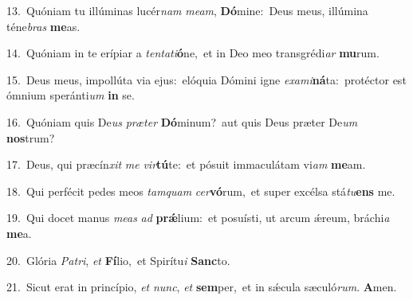 {\numbfont\textcolor{\numbcolor}{13.}}~Quóniam tu illúminas lucér\textit{nam} \textit{me}\-\textit{am}, \textbf{Dó}\-mine:~\star Deus meus, illúmina téne\textit{bras} \textbf{me}\-as.\par
{\numbfont\textcolor{\numbcolor}{14.}}~Quóniam in te erípiar a \textit{ten}\-\textit{ta}\textit{ti}\textbf{ó}ne,~\star et in Deo meo transgrédi\textit{ar} \textbf{mu}\-rum.\par
{\numbfont\textcolor{\numbcolor}{15.}}~Deus meus, impollúta via ejus:~\dagger elóquia Dómini igne \textit{ex}\-\textit{a}\textit{mi}\textbf{ná}ta:~\star protéctor est ómnium speránti\textit{um} \textbf{in} se.\par
{\numbfont\textcolor{\numbcolor}{16.}}~Quóniam quis De\textit{us} \textit{præ}\-\textit{ter} \textbf{Dó}\-minum?~\star aut quis Deus præter De\textit{um} \textbf{nos}\-trum?\par
{\numbfont\textcolor{\numbcolor}{17.}}~Deus, qui præcín\textit{xit} \textit{me} \textit{vir}\-\textbf{tú}te:~\star et pósuit immaculátam vi\textit{am} \textbf{me}\-am.\par
{\numbfont\textcolor{\numbcolor}{18.}}~Qui perfécit pedes meos \textit{tam}\-\textit{quam} \textit{cer}\-\textbf{vó}rum,~\star et super excélsa stá\-\textit{tu}\-\textbf{ens} me.\par
{\numbfont\textcolor{\numbcolor}{19.}}~Qui docet manus \textit{me}\-\textit{as} \textit{ad} \textbf{prǽ}\-lium:~\star et posuísti, ut arcum ǽreum, bráchi\textit{a} \textbf{me}\-a.\par
{\numbfont\textcolor{\numbcolor}{20.}}~Glória \textit{Pa}\-\textit{tri}, \textit{et} \textbf{Fí}\-lio,~\star et Spirítu\textit{i} \textbf{Sanc}\-to.\par
{\numbfont\textcolor{\numbcolor}{21.}}~Sicut erat in princípio, \textit{et} \textit{nunc}\-, \textit{et} \textbf{sem}\-per,~\star et in sǽcula sæculó\-\textit{rum}\-. \textbf{A}\-men.\par
